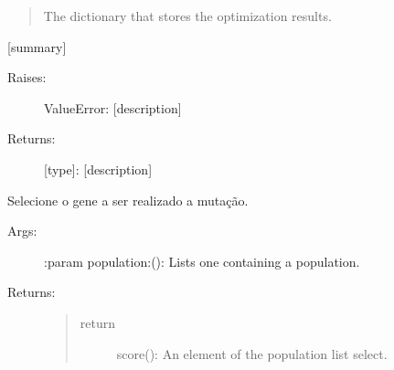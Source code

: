 \documentclass[letterpaper,10pt,english]{sphinxmanual}
\begin{document}
\begin{fulllineitems}
\begin{fulllineitems}
\begin{description}
\end{description}
\begin{quote}

The dictionary that stores the optimization results.
\end{quote}

\end{fulllineitems}


\begin{fulllineitems}
\label{\detokenize{index:ga.Genetic.selection}}
{[}summary{]}
\begin{description}
\item[{Raises:}] \leavevmode
ValueError: {[}description{]}

\item[{Returns:}] \leavevmode
{[}type{]}: {[}description{]}

\end{description}

\end{fulllineitems}


\begin{fulllineitems}
\label{\detokenize{index:ga.Genetic.sorted_population}}
Selecione o gene a ser realizado a mutação.
\begin{description}
\item[{Args:}] \leavevmode
:param population:(): Lists one containing a population.

\item[{Returns:}] \leavevmode\begin{quote}\begin{description}
\item[{return}] \leavevmode
score(): An element of the population list select.

\end{description}\end{quote}

\end{description}


\end{fulllineitems}
\end{fulllineitems}
\end{document}
